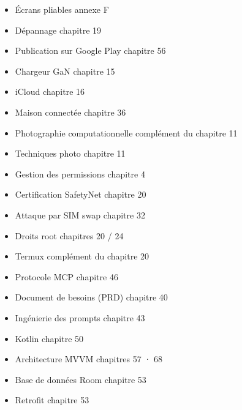 
\begin{itemize}
  \item Écrans pliables annexe F
  \item Dépannage chapitre 19
  \item Publication sur Google Play chapitre 56
  \item Chargeur GaN chapitre 15
  \item iCloud chapitre 16
  \item Maison connectée chapitre 36
  \item Photographie computationnelle complément du chapitre 11
\end{itemize}


\begin{itemize}
  \item Techniques photo chapitre 11
  \item Gestion des permissions chapitre 4
  \item Certification SafetyNet chapitre 20
  \item Attaque par SIM swap chapitre 32
  \item Droits root chapitres 20 / 24
  \item Termux complément du chapitre 20
  \item Protocole MCP chapitre 46
  \item Document de besoins (PRD) chapitre 40
  \item Ingénierie des prompts chapitre 43
  \item Kotlin chapitre 50
  \item Architecture MVVM chapitres 57 · 68
  \item Base de données Room chapitre 53
  \item Retrofit chapitre 53
\end{itemize}


